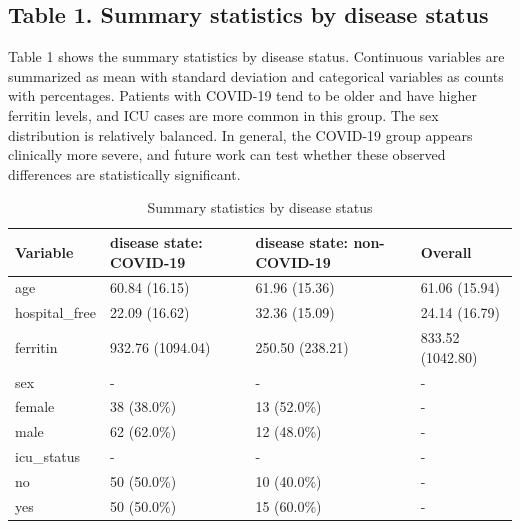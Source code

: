 \documentclass{article}
\begin{document}
\subsection{Table 1. Summary statistics by disease status}

Table 1 shows the summary statistics by disease status. Continuous variables are summarized as mean with standard deviation and categorical variables as counts with percentages. Patients with COVID-19 tend to be older and have higher ferritin levels, and ICU cases are more common in this group. The sex distribution is relatively balanced. In general, the COVID-19 group appears clinically more severe, and future work can test whether these observed differences are statistically significant.

\begin{table}[H]
\centering
\caption{\label{tab:summary}Summary statistics by disease status}
\begin{tabular}{llll}
\hline
{\color[HTML]{222222} Variable} &
  {\color[HTML]{222222} disease state: COVID-19} &
  {\color[HTML]{222222} disease state: non-COVID-19} &
  {\color[HTML]{222222} Overall} \\ \hline
{\color[HTML]{222222} age} &
  {\color[HTML]{222222} 60.84 (16.15)} &
  {\color[HTML]{222222} 61.96 (15.36)} &
  {\color[HTML]{222222} 61.06 (15.94)} \\
{\color[HTML]{222222} hospital\_free} &
  {\color[HTML]{222222} 22.09 (16.62)} &
  {\color[HTML]{222222} 32.36 (15.09)} &
  {\color[HTML]{222222} 24.14 (16.79)} \\
{\color[HTML]{222222} ferritin} &
  {\color[HTML]{222222} 932.76 (1094.04)} &
  {\color[HTML]{222222} 250.50 (238.21)} &
  {\color[HTML]{222222} 833.52 (1042.80)} \\
{\color[HTML]{222222} sex}         & {\color[HTML]{222222} -}           & {\color[HTML]{222222} -}           & {\color[HTML]{222222} -} \\
{\color[HTML]{222222} female}      & {\color[HTML]{222222} 38 (38.0\%)} & {\color[HTML]{222222} 13 (52.0\%)} & {\color[HTML]{222222} -} \\
{\color[HTML]{222222} male}        & {\color[HTML]{222222} 62 (62.0\%)} & {\color[HTML]{222222} 12 (48.0\%)} & {\color[HTML]{222222} -} \\
{\color[HTML]{222222} icu\_status} & {\color[HTML]{222222} -}           & {\color[HTML]{222222} -}           & {\color[HTML]{222222} -} \\
{\color[HTML]{222222} no}          & {\color[HTML]{222222} 50 (50.0\%)} & {\color[HTML]{222222} 10 (40.0\%)} & {\color[HTML]{222222} -} \\
{\color[HTML]{222222} yes}         & {\color[HTML]{222222} 50 (50.0\%)} & {\color[HTML]{222222} 15 (60.0\%)} & {\color[HTML]{222222} -} \\ \hline
\end{tabular}
\end{table}
\end{document}
